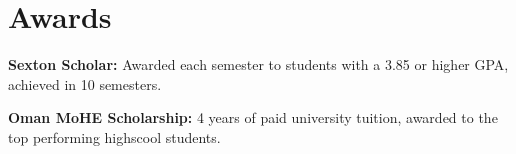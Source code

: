 \documentclass[letterpaper,11pt]{article}
\begin{document}
\section{Awards}
 \begin{itemize}[leftmargin=0.15in, label={}]
    \small{\item{
   
     \textbf{Sexton Scholar:}{ Awarded each semester to students with a 3.85 or higher GPA, achieved in 10 semesters.}
    
    \textbf{Oman MoHE Scholarship:}{ 4 years of paid university tuition, awarded to the top performing highscool students.}
    }}
 \end{itemize}



\end{document}
